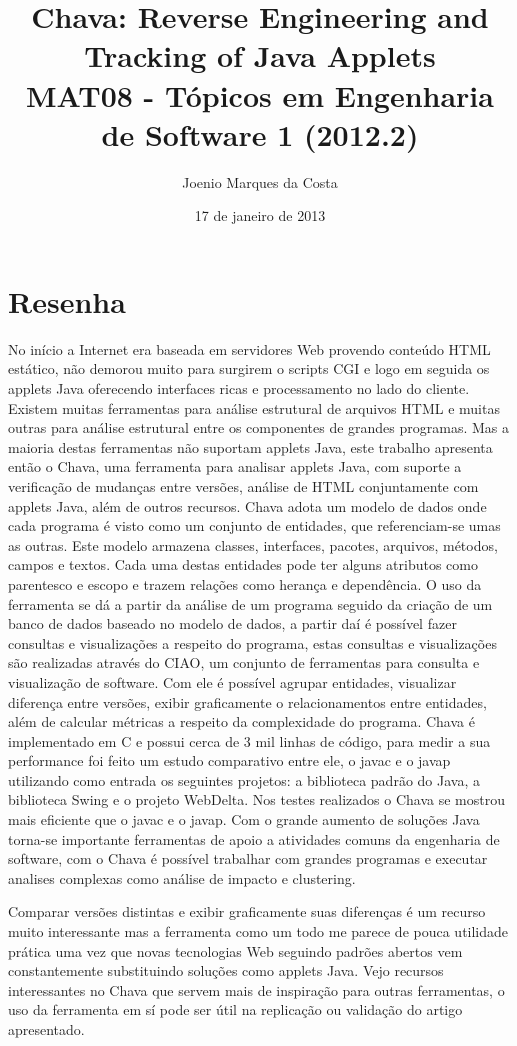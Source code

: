 \documentclass[12pt]{article}
\title{Chava: Reverse Engineering and Tracking of Java Applets
 \cite{Chava} \\
 \large MAT08 - Tópicos em Engenharia de Software 1 (2012.2)}
\author{Joenio Marques da Costa}
\date{17 de janeiro de 2013}
\begin{document}
\maketitle

\section*{Resenha}

No início a Internet era baseada em servidores Web provendo conteúdo HTML
estático, não demorou muito para surgirem o scripts CGI
e logo em seguida os applets Java oferecendo
interfaces ricas e processamento no lado do cliente. Existem muitas
ferramentas para análise estrutural de arquivos HTML e muitas outras para
análise estrutural entre os componentes de grandes programas. Mas a maioria
destas ferramentas não suportam applets Java, este trabalho apresenta então o
Chava, uma ferramenta para analisar applets Java, com suporte a verificação de
mudanças entre versões, análise de HTML conjuntamente com applets Java, além
de outros recursos. Chava adota um modelo de dados onde cada programa é visto
como um conjunto de entidades, que referenciam-se umas as outras. Este modelo armazena classes,
interfaces, pacotes, arquivos, métodos, campos e textos. Cada uma destas
entidades pode ter alguns atributos como parentesco e escopo e trazem relações
como herança e dependência. O uso da ferramenta se dá a partir da análise de
um programa seguido da criação de um banco de dados baseado no modelo de
dados, a partir daí é possível fazer consultas e visualizações a respeito do
programa, estas consultas e visualizações são realizadas através do CIAO, um
conjunto de ferramentas para consulta e visualização de software. Com ele é
possível agrupar entidades, visualizar diferença entre versões, exibir
graficamente o relacionamentos entre entidades, além de calcular métricas a
respeito da complexidade do programa. Chava é implementado em C e possui cerca
de 3 mil linhas de código, para medir a sua performance foi feito um estudo
comparativo entre ele, o javac e o javap utilizando como entrada os seguintes
projetos: a biblioteca padrão do Java, a biblioteca Swing e o projeto
WebDelta. Nos testes realizados o Chava se mostrou mais
eficiente que o javac e o javap. Com o grande aumento de soluções Java
torna-se importante ferramentas de apoio a atividades comuns da engenharia de
software, com o Chava é possível trabalhar com grandes programas e executar
analises complexas como análise de impacto e clustering.

Comparar versões distintas e exibir graficamente suas diferenças é um recurso
muito interessante mas a ferramenta como um todo me parece de pouca utilidade
prática uma vez que novas tecnologias Web seguindo padrões abertos vem
constantemente substituindo soluções como applets Java. Vejo recursos
interessantes no Chava que servem mais de inspiração para outras ferramentas,
o uso da ferramenta em sí pode ser útil na replicação ou validação do artigo
apresentado.


\end{document}
